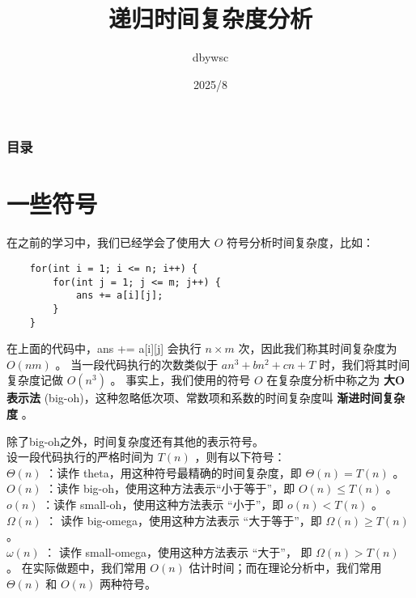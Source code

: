 \documentclass{beamer}
\title{递归时间复杂度分析}
\author{dbywsc}
\date{2025/8}
\newcommand{\fdf}[1]{\alert{\textbf{#1}}}
\begin{document}
\frame{\titlepage}
\begin{frame}
	\frametitle{目录}
	\tableofcontents
\end{frame}
\section{一些符号}
\begin{frame}[fragile]
在之前的学习中，我们已经学会了使用大 $O$ 符号分析时间复杂度，比如：
\begin{onlyenv}
\begin{verbatim}
    for(int i = 1; i <= n; i++) {
        for(int j = 1; j <= m; j++) {
            ans += a[i][j];
        }
    }
\end{verbatim}
\end{onlyenv}
在上面的代码中，ans += a[i][j] 会执行 $n \times m$ 次，因此我们称其时间复杂度为 $O(nm)$ 。
当一段代码执行的次数类似于 $an^3 + bn^2 + cn + T$ 时，我们将其时间复杂度记做 $O(n^3)$ 。
事实上，我们使用的符号 $O$ 在复杂度分析中称之为 \fdf{大O表示法} (big-oh)，这种忽略低次项、常数项和系数的时间复杂度叫 \fdf{渐进时间复杂度} 。
\end{frame}
\begin{frame}
除了big-oh之外，时间复杂度还有其他的表示符号。\\
设一段代码执行的严格时间为 $T(n)$ ，则有以下符号：\\
$\Theta(n)$ ：读作 theta，用这种符号最精确的时间复杂度，即 $\Theta(n) = T(n)$ 。 \\ 
$O(n)$ ：读作 big-oh，使用这种方法表示“小于等于”，即 $O(n) \leq T(n)$ 。 \\ 
$o(n)$ ：读作 small-oh，使用这种方法表示 “小于”，即 $o(n) < T(n)$ 。 \\ 
$\Omega(n)$ ： 读作 big-omega，使用这种方法表示 “大于等于”，即 $\Omega(n) \geq T(n)$ 。 \\ 
$\omega(n)$ ： 读作 small-omega，使用这种方法表示 “大于”， 即 $\Omega(n) > T(n)$ 。
在实际做题中，我们常用 $O(n)$ 估计时间；而在理论分析中，我们常用 $\Theta(n)$ 和 $O(n)$ 两种符号。
\end{frame}
\end{document}
